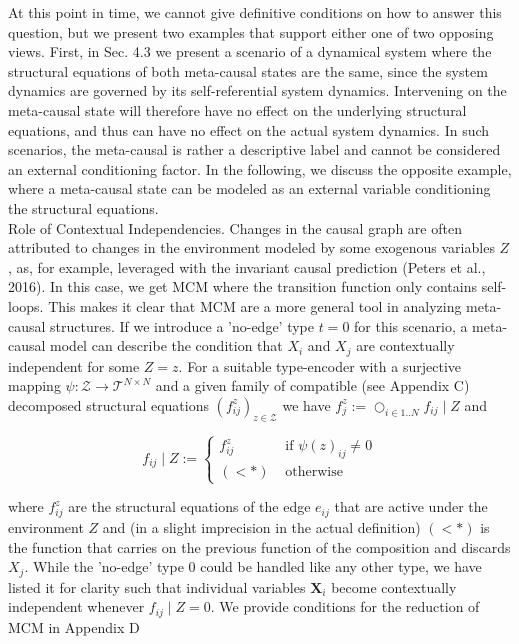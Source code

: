 \documentclass[10pt]{article}
\begin{document}
At this point in time, we cannot give definitive conditions on how to answer this question, but we present two examples that support either one of two opposing views. First, in Sec. 4.3 we present a scenario of a dynamical system where the structural equations of both meta-causal states are the same, since the system dynamics are governed by its self-referential system dynamics. Intervening on the meta-causal state will therefore have no effect on the underlying structural equations, and thus can have no effect on the actual system dynamics. In such scenarios, the meta-causal is rather a descriptive label and cannot be considered an external conditioning factor. In the following, we discuss the opposite example, where a meta-causal state can be modeled as an external variable conditioning the structural equations.\\
Role of Contextual Independencies. Changes in the causal graph are often attributed to changes in the environment modeled by some exogenous variables $Z$, as, for example, leveraged with the invariant causal prediction (Peters et al., 2016). In this case, we get MCM where the transition function only contains self-loops. This makes it clear that MCM are a more general tool in analyzing meta-causal structures. If we introduce a 'no-edge' type $t=0$ for this scenario, a meta-causal model can describe the condition that $X_{i}$ and $X_{j}$ are contextually independent for some $Z=z$. For a suitable type-encoder with a surjective mapping $\psi: \mathcal{Z} \rightarrow \mathcal{T}^{N \times N}$ and a given family of compatible (see Appendix C) decomposed structural equations $\left(f_{i j}^{z}\right)_{z \in \mathcal{Z}}$ we have $f_{j}^{z}:=\bigcirc_{i \in 1 . . N} f_{i j} \mid Z$ and

\[
f_{i j} \mid Z:= \begin{cases}f_{i j}^{z} & \text { if } \psi(z)_{i j} \neq 0  \tag{1}\\ (<*) & \text { otherwise }\end{cases}
\]

where $f_{i j}^{z}$ are the structural equations of the edge $e_{i j}$ that are active under the environment $Z$ and (in a slight imprecision in the actual definition) $(<*)$ is the function that carries on the previous function of the composition and discards $X_{j}$. While the 'no-edge' type 0 could be handled like any other type, we have listed it for clarity such that individual variables $\mathbf{X}_{i}$ become contextually independent whenever $f_{i j} \mid Z=0$. We provide conditions for the reduction of MCM in Appendix D
\end{document}

